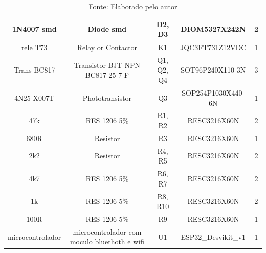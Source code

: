 \documentclass[../delivery_hospital_report.tex]{subfiles}
\begin{document}
\begin{table}[!ht]
\begin{adjustbox}{width=\columnwidth,center}
\begin{tabular}{|c|c|c|c|c|}
1N4007 smd       & Diode smd                                      & D2, D3                                                               & DIOM5327X242N       & 2        \\ \hline
rele T73         & Relay or Contactor                             & K1                                                                   & JQC3FT731Z12VDC     & 1        \\ \hline
Trans BC817      & Transistor BJT NPN   BC817-25-7-F              & Q1, Q2, Q4                                                           & SOT96P240X110-3N    & 3        \\ \hline
4N25-X007T       & Phototransistor                                & Q3                                                                   & SOP254P1030X440-6N  & 1        \\ \hline
47k              & RES 1206 5\%                                   & R1, R2                                                               & RESC3216X60N        & 2        \\ \hline
680R             & Resistor                                       & R3                                                                   & RESC3216X60N        & 1        \\ \hline
2k2              & Resistor                                       & R4, R5                                                               & RESC3216X60N        & 2        \\ \hline
4k7              & RES 1206 5\%                                   & R6, R7                                                               & RESC3216X60N        & 2        \\ \hline
1k               & RES 1206 5\%                                   & R8, R10                                                              & RESC3216X60N        & 2        \\ \hline
100R             & RES 1206 5\%                                   & R9                                                                   & RESC3216X60N        & 1        \\ \hline
microcontrolador & microcontrolador com   moculo bluethoth e wifi & U1                                                                   & ESP32\_Desvikit\_v1 & 1        \\ \hline

\end{tabular}
\end{adjustbox}
\centering
\caption*{Fonte: Elaborado pelo autor}
\label{table:Componentes Utilizados na placa de Interface com Usuário}
\end{table}
\end{document}
